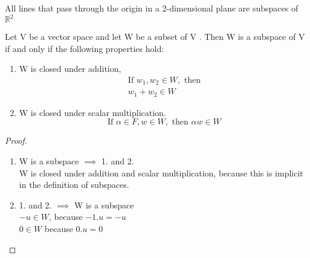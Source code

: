 \documentclass{report}
\begin{document}
\begin{note}
    All lines that pass through the origin in a 2-dimensional plane are subspaces of $\mathbb{R}^2$
\end{note}
\pagebreak
\begin{lemma}
    Let V be a vector space and let W be a subset of V . Then W is a subspace of V if and only if the following properties hold:
    \begin{enumerate}
        \item W is closed under addition, 
            \begin{align*}
                \text{If } w_1, w_2 \in W, \text{ then} \\
            w_1 + w_2 \in W
            \end{align*}
        \item W is closed under scalar multiplication.
            \[
                \text{If }  \alpha \in F, w \in W, \text{ then } \alpha w \in W
            \]
    \end{enumerate}
\end{lemma}
\begin{proof}
    \begin{enumerate}
        \item W is a subspace $\implies$ 1. and 2.\\
            W is closed under addition and scalar multiplication, because this is implicit in the definition of subspaces.
        \item 1. and 2. $\implies$ W is a subspace  \\
            $-u \in W$, because $-1.u = -u$ \\
            $0 \in W$ because $0.u = 0$
    \end{enumerate}
\end{proof}
\end{document}
